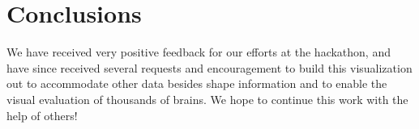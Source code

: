 \documentclass[twocolumn]{bmcart}%
\begin{document}
\section{Conclusions}\label{conclusions}

We have received very positive feedback for our efforts at the
hackathon, and have since received several requests and encouragement to
build this visualization out to accommodate other data besides shape
information and to enable the visual evaluation of thousands of brains.
We hope to continue this work with the help of others!

\end{document}
